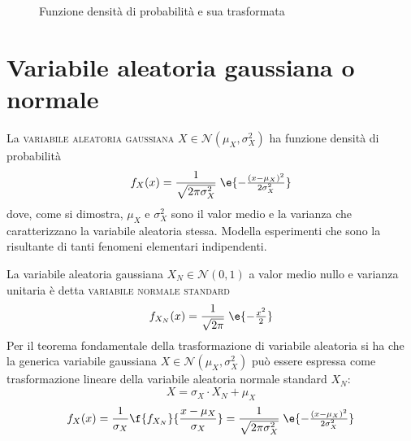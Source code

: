 \begin{esempio}
\begin{figure}[h]
	\centering
	\qquad
	\caption{Funzione densità di probabilità e sua trasformata}
\end{figure}

\end{esempio}

\section{Variabile aleatoria gaussiana o normale}
La \textsc{variabile aleatoria gaussiana} $X\in\mathcal{N}(\mu_X,\sigma^2_X)$ ha funzione densità di probabilità
\begin{equation}
\label{eq:densita_gaussiana}
	f_X(x)=\frac{1}{\sqrt{2\pi\sigma^2_X}}\;\e{-\tfrac{(x-\mu_X)^2}{2\sigma^2_X}}
\end{equation}
dove, come si dimostra, $\mu_X$ e $\sigma^2_X$ sono il valor medio e la varianza che caratterizzano la variabile aleatoria stessa.
Modella esperimenti che sono la risultante di tanti fenomeni elementari indipendenti.

La variabile aleatoria gaussiana $X_N\in\mathcal{N}(0,1)$ a valor medio nullo e varianza unitaria è detta \textsc{variabile normale standard}
\begin{equation}
\label{eq:densita_normale}
	f_{X_N}(x)=\frac{1}{\sqrt{2\pi}}\;\e{-\tfrac{x^2}{2}}
\end{equation}
Per il teorema fondamentale della trasformazione di variabile aleatoria si ha che la generica variabile gaussiana $X\in\mathcal{N}(\mu_X,\sigma^2_X)$ può essere espressa come trasformazione lineare della variabile aleatoria normale standard $X_N$:
\begin{equation}
	X=\sigma_X\cdot X_N+\mu_X
\end{equation}
\begin{equation}
	f_X(x)=\frac{1}{\sigma_X}\f{f_{X_N}}{\frac{x-\mu_X}{\sigma_X}}=\frac{1}{\sqrt{2\pi\sigma^2_X}}\;\e{-\tfrac{(x-\mu_X)^2}{2\sigma^2_X}}
\end{equation}


